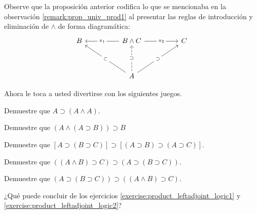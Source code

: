\documentclass{article}
\begin{document}
\begin{remark}
    Observe que la proposición anterior codifica lo que se mencionaba en la observación
    \ref{remark:prop_univ_prod1} al presentar las reglas de introducción y eliminación de $\land$
    de forma diagramática:
    \[\begin{tikzcd}
    	B && {B \land C} && C \\
    	\\
    	&& A
    	\arrow["\supset"{description}, from=3-3, to=1-5]
    	\arrow["\subset"{description}, from=3-3, to=1-1]
    	\arrow["\pi_1"{description}, from=1-3, to=1-1]
    	\arrow["\pi_2"{description}, from=1-3, to=1-5]
    	\arrow["\supset"{description}, dashed, from=3-3, to=1-3]
    \end{tikzcd}\]
\end{remark}

Ahora le toca a usted divertirse con los siguientes juegos.

\begin{exercise}
    Demuestre que $A \supset (A \land A)$.
\end{exercise}

\begin{exercise}
    Demuestre que $(A \land (A \supset B)) \supset B$
\end{exercise}

\begin{exercise}
    Demuestre que $[A \supset (B \supset C)] \supset [(A \supset B) \supset (A \supset C)]$.
\end{exercise}

\begin{exercise}\label{exercise:product_leftadjoint_logic1}
    Demuestre que $((A \land B) \supset C) \supset (A \supset (B \supset C))$.
\end{exercise}

\begin{exercise}\label{exercise:product_leftadjoint_logic2}
    Demuestre que $(A \supset (B \supset C)) \supset ((A \land B) \supset C)$.
\end{exercise}

\begin{exercise}
    ¿Qué puede concluir de los ejercicios \ref{exercise:product_leftadjoint_logic1} y \ref{exercise:product_leftadjoint_logic2}?
\end{exercise}
\end{document}
